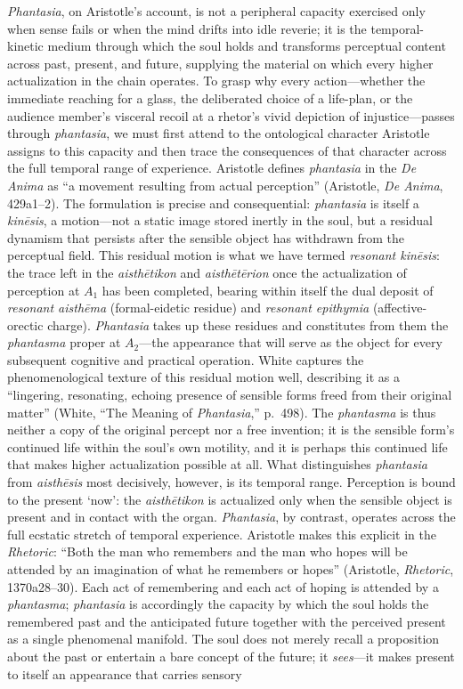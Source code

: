 \documentclass{article}
\begin{document}
\textit{Phantasia}, on Aristotle's account, is not a peripheral capacity exercised only when sense fails or when the mind drifts into idle reverie; it is the temporal-kinetic medium through which the soul holds and transforms perceptual content across past, present, and future, supplying the material on which every higher actualization in the chain operates. To grasp why every action---whether the immediate reaching for a glass, the deliberated choice of a life-plan, or the audience member's visceral recoil at a rhetor's vivid depiction of injustice---passes through \textit{phantasia}, we must first attend to the ontological character Aristotle assigns to this capacity and then trace the consequences of that character across the full temporal range of experience. Aristotle defines \textit{phantasia} in the \textit{De Anima} as ``a movement resulting from actual perception'' (Aristotle, \textit{De Anima}, 429a1--2). The formulation is precise and consequential: \textit{phantasia} is itself a \textit{kin\={e}sis}, a motion---not a static image stored inertly in the soul, but a residual dynamism that persists after the sensible object has withdrawn from the perceptual field. This residual motion is what we have termed \textit{resonant kin\={e}sis}: the trace left in the \textit{aisth\={e}tikon} and \textit{aisth\={e}t\={e}rion} once the actualization of perception at $A_1$ has been completed, bearing within itself the dual deposit of \textit{resonant aisth\={e}ma} (formal-eidetic residue) and \textit{resonant epithymia} (affective-orectic charge). \textit{Phantasia} takes up these residues and constitutes from them the \textit{phantasma} proper at $A_2$---the appearance that will serve as the object for every subsequent cognitive and practical operation. White captures the phenomenological texture of this residual motion well, describing it as a ``lingering, resonating, echoing presence of sensible forms freed from their original matter'' (White, ``The Meaning of \textit{Phantasia},'' p.~498). The \textit{phantasma} is thus neither a copy of the original percept nor a free invention; it is the sensible form's continued life within the soul's own motility, and it is perhaps this continued life that makes higher actualization possible at all. What distinguishes \textit{phantasia} from \textit{aisth\={e}sis} most decisively, however, is its temporal range. Perception is bound to the present `now': the \textit{aisth\={e}tikon} is actualized only when the sensible object is present and in contact with the organ. \textit{Phantasia}, by contrast, operates across the full ecstatic stretch of temporal experience. Aristotle makes this explicit in the \textit{Rhetoric}: ``Both the man who remembers and the man who hopes will be attended by an imagination of what he remembers or hopes'' (Aristotle, \textit{Rhetoric}, 1370a28--30). Each act of remembering and each act of hoping is attended by a \textit{phantasma}; \textit{phantasia} is accordingly the capacity by which the soul holds the remembered past and the anticipated future together with the perceived present as a single phenomenal manifold. The soul does not merely recall a proposition about the past or entertain a bare concept of the future; it \textit{sees}---it makes present to itself an appearance that carries sensory 
\end{document}
